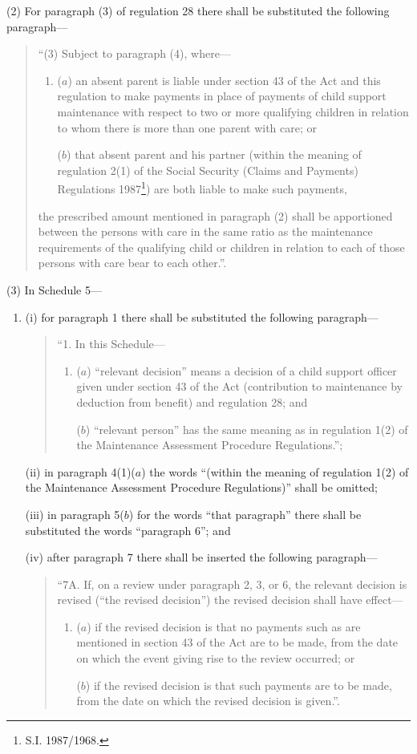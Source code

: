 \documentclass[12pt,a4paper]{article}
\begin{document}
(2) For paragraph (3) of regulation 28 there shall be substituted the following paragraph—
\begin{quotation}
“(3) Subject to paragraph (4), where—
\begin{enumerate}\item[]
($a$) an absent parent is liable under section 43 of the Act and this regulation to make payments in place of payments of child support maintenance with respect to two or more qualifying children in relation to whom there is more than one parent with care; or

($b$) that absent parent and his partner (within the meaning of regulation 2(1) of the Social Security (Claims and Payments) Regulations 1987\footnote{\frenchspacing S.I. 1987/1968.}) are both liable to make such payments,
\end{enumerate}
the prescribed amount mentioned in paragraph (2) shall be apportioned between the persons with care in the same ratio as the maintenance requirements of the qualifying child or children in relation to each of those persons with care bear to each other.”.
\end{quotation}

(3) In Schedule 5—
\begin{enumerate}\item[]
(i) for paragraph 1 there shall be substituted the following paragraph—
\begin{quotation}
“1.  In this Schedule—
\begin{enumerate}\item[]
($a$) “relevant decision” means a decision of a child support officer given under section 43 of the Act (contribution to maintenance by deduction from benefit) and regulation 28; and

($b$) “relevant person” has the same meaning as in regulation 1(2) of the Maintenance Assessment Procedure Regulations.”;
\end{enumerate}
\end{quotation}

(ii) in paragraph 4(1)($a$) the words “(within the meaning of regulation 1(2) of the Maintenance Assessment Procedure Regulations)” shall be omitted;

(iii) in paragraph 5($b$) for the words “that paragraph” there shall be substituted the words “paragraph 6”; and

(iv) after paragraph 7 there shall be inserted the following paragraph—
\begin{quotation}
“7A.  If, on a review under paragraph 2, 3, or 6, the relevant decision is revised (“the revised decision”) the revised decision shall have effect—
\begin{enumerate}\item[]
($a$) if the revised decision is that no payments such as are mentioned in section 43 of the Act are to be made, from the date on which the event giving rise to the review occurred; or

($b$) if the revised decision is that such payments are to be made, from the date on which the revised decision is given.”.
\end{enumerate}
\end{quotation}
\end{enumerate}
\end{document}
